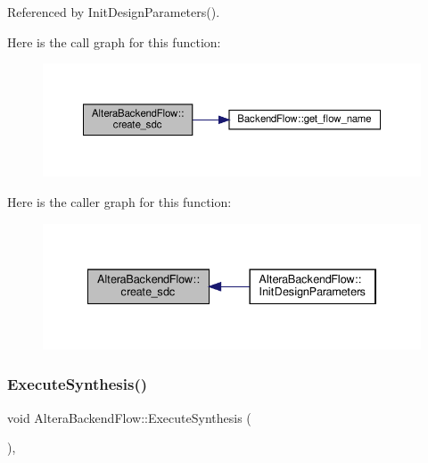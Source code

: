 Referenced by Init\+Design\+Parameters().

Here is the call graph for this function\+:
\nopagebreak
\begin{figure}[H]
\begin{center}
\leavevmode
\includegraphics[width=350pt]{d2/d83/classAlteraBackendFlow_a176b73daf2c6c80d929647205b95571d_cgraph}
\end{center}
\end{figure}
Here is the caller graph for this function\+:
\nopagebreak
\begin{figure}[H]
\begin{center}
\leavevmode
\includegraphics[width=334pt]{d2/d83/classAlteraBackendFlow_a176b73daf2c6c80d929647205b95571d_icgraph}
\end{center}
\end{figure}
\mbox{\label{classAlteraBackendFlow_a02d5cfd65ba8c97fd8b3c9781014c22c}} 
\subsubsection{\texorpdfstring{Execute\+Synthesis()}{ExecuteSynthesis()}}
{\footnotesize\ttfamily void Altera\+Backend\+Flow\+::\+Execute\+Synthesis (\begin{DoxyParamCaption}{ }\end{DoxyParamCaption})\hspace{0.3cm}{\ttfamily [override]}, {\ttfamily [virtual]}}



